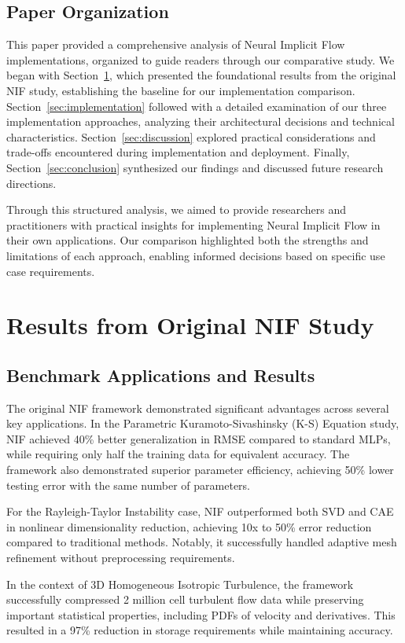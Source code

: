 \documentclass[10pt,journal,compsoc,onecolumn]{IEEEtran}
\begin{document}
\subsection{Paper Organization}
This paper provided a comprehensive analysis of Neural Implicit Flow implementations, organized to guide readers through our comparative study. We began with Section~\ref{sec:original_results}, which presented the foundational results from the original NIF study, establishing the baseline for our implementation comparison. Section~\ref{sec:implementation} followed with a detailed examination of our three implementation approaches, analyzing their architectural decisions and technical characteristics. Section~\ref{sec:discussion} explored practical considerations and trade-offs encountered during implementation and deployment. Finally, Section~\ref{sec:conclusion} synthesized our findings and discussed future research directions.

Through this structured analysis, we aimed to provide researchers and practitioners with practical insights for implementing Neural Implicit Flow in their own applications. Our comparison highlighted both the strengths and limitations of each approach, enabling informed decisions based on specific use case requirements.

\section{Results from Original NIF Study}\label{sec:original_results}
\subsection{Benchmark Applications and Results}
The original NIF framework demonstrated significant advantages across several key applications. In the Parametric Kuramoto-Sivashinsky (K-S) Equation study, NIF achieved 40\% better generalization in RMSE compared to standard MLPs, while requiring only half the training data for equivalent accuracy. The framework also demonstrated superior parameter efficiency, achieving 50\% lower testing error with the same number of parameters.

For the Rayleigh-Taylor Instability case, NIF outperformed both SVD and CAE in nonlinear dimensionality reduction, achieving 10x to 50\% error reduction compared to traditional methods. Notably, it successfully handled adaptive mesh refinement without preprocessing requirements.

In the context of 3D Homogeneous Isotropic Turbulence, the framework successfully compressed 2 million cell turbulent flow data while preserving important statistical properties, including PDFs of velocity and derivatives. This resulted in a 97\% reduction in storage requirements while maintaining accuracy.
\end{document}
